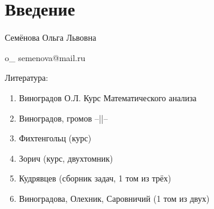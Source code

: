 \def\@lecture{}%
\newcommand{\lecture}[3]{
    \ifthenelse{\isempty{#3}}{%
        \def\@lecture{Lecture #1}%
    }{%
        \def\@lecture{Lecture #1: #3}%
    }%
    \subsection*{\@lecture}
    \marginpar{\small\textsf{\mbox{#2}}}
}
\usepackage{todonotes}
\usepackage{tcolorbox}

\newenvironment{correction}{\begin{tcolorbox}[
    arc=0mm,
    colback=white,
    colframe=green!60!black,
    title=Correction,
    fonttitle=\sffamily,
    breakable
]}{\end{tcolorbox}}
\usepackage{fancyhdr}
\pagestyle{fancy}


\fancyhead[RO,LE]{\@lecture} %
\fancyhead[RE,LO]{}          %

\fancyfoot[RO,LE]{\thepage}  %
\fancyfoot[RE,LO]{}          %
\fancyfoot[C]{\leftmark}     %

\usepackage{import}
\usepackage{xifthen}
\usepackage{pdfpages}
\usepackage{transparent}
\newcommand{\incfig}[1]{%
    \def\svgwidth{\columnwidth}
    {#1.pdf_tex}
}
\usepackage{tikz}
\usepackage{pgfplots}

    \maketitle
    \tableofcontents
    \newpage
    \section{Введение}
    Семёнова Ольга Львовна

    o\_ semenova@mail.ru

   
   Литература: \begin{enumerate}
       \item Виноградов О.Л. Курс Математического анализа
       \item Виноградов, громов --||--
       \item Фихтенгольц (курс)
       \item Зорич (курс, двухтомник)
       \item Кудрявцев (сборник задач, 1 том из трёх)
       \item Виноградова, Олехник, Саровничий (1 том из двух)
   \end{enumerate}


